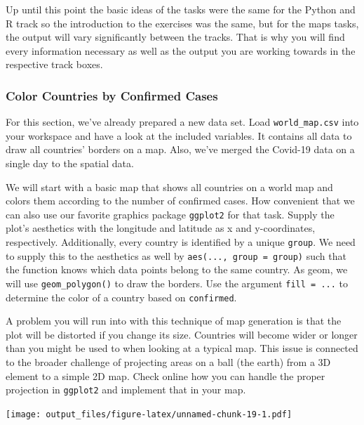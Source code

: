 \documentclass[
  11pt,
]{article}
\newenvironment{tips}[1]
  {
  \begin{itemize}
  \footnotesize
  \renewcommand{\labelitemi}{
    \raisebox{-.7\height}[0pt][0pt]{
      {\setkeys{Gin}{width=3em,keepaspectratio}
        \texttt{[image: images/\#1.png]}}
    }
  }
  \setlength{\fboxsep}{1em}
  \begin{rbox}
  \item
  }
  {
  \end{rbox}
  \end{itemize}
  }
\begin{document}
Up until this point the basic ideas of the tasks were the same for the Python and R track so the introduction to the exercises was the same, but for the maps tasks, the output will vary significantly between the tracks. That is why you will find every information necessary as well as the output you are working towards in the respective track boxes.

\hypertarget{color-countries-by-confirmed-cases}{%
\subsubsection{Color Countries by Confirmed Cases}\label{color-countries-by-confirmed-cases}}

\begin{tips}r

For this section, we've already prepared a new data set. Load \texttt{world\_map.csv} into your workspace and have a look at the included variables. It contains all data to draw all countries' borders on a map. Also, we've merged the Covid-19 data on a single day to the spatial data.

We will start with a basic map that shows all countries on a world map and colors them according to the number of confirmed cases. How convenient that we can also use our favorite graphics package \texttt{ggplot2} for that task. Supply the plot's aesthetics with the longitude and latitude as x and y-coordinates, respectively. Additionally, every country is identified by a unique \texttt{group}. We need to supply this to the aesthetics as well by \texttt{aes(...,\ group\ =\ group)} such that the function knows which data points belong to the same country. As geom, we will use \texttt{geom\_polygon()} to draw the borders. Use the argument \texttt{fill\ =\ ...} to determine the color of a country based on \texttt{confirmed}.

A problem you will run into with this technique of map generation is that the plot will be distorted if you change its size. Countries will become wider or longer than you might be used to when looking at a typical map. This issue is connected to the broader challenge of projecting areas on a ball (the earth) from a 3D element to a simple 2D map. Check online how you can handle the proper projection in \texttt{ggplot2} and implement that in your map.

\texttt{[image: output\_files/figure-latex/unnamed-chunk-19-1.pdf]}

\end{tips}
\end{document}
